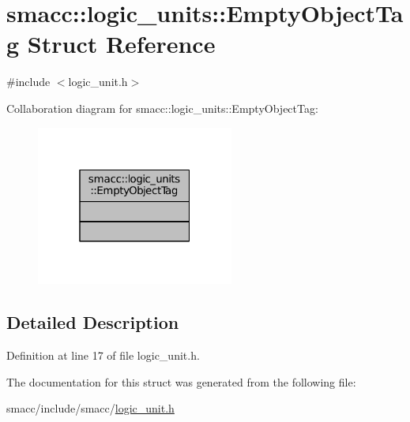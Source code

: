 \hypertarget{structsmacc_1_1logic__units_1_1EmptyObjectTag}{}\section{smacc\+:\+:logic\+\_\+units\+:\+:Empty\+Object\+Tag Struct Reference}
\label{structsmacc_1_1logic__units_1_1EmptyObjectTag}


{\ttfamily \#include $<$logic\+\_\+unit.\+h$>$}



Collaboration diagram for smacc\+:\+:logic\+\_\+units\+:\+:Empty\+Object\+Tag\+:
\nopagebreak
\begin{figure}[H]
\begin{center}
\leavevmode
\includegraphics[width=184pt]{structsmacc_1_1logic__units_1_1EmptyObjectTag__coll__graph}
\end{center}
\end{figure}


\subsection{Detailed Description}


Definition at line 17 of file logic\+\_\+unit.\+h.



The documentation for this struct was generated from the following file\+:\begin{DoxyCompactItemize}
\item 
smacc/include/smacc/\hyperlink{logic__unit_8h}{logic\+\_\+unit.\+h}\end{DoxyCompactItemize}
